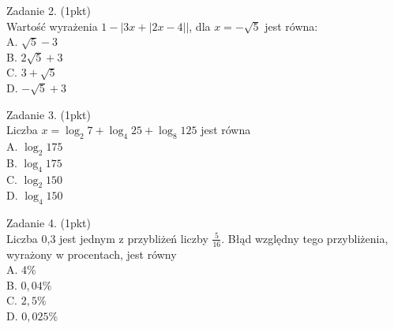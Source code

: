 \documentclass[10pt]{article}
\begin{document}
Zadanie 2. (1pkt)\\
Wartość wyrażenia \(1-|3 x+|2 x-4||\), dla \(x=-\sqrt{5}\) jest równa:\\
A. \(\sqrt{5}-3\)\\
B. \(2 \sqrt{5}+3\)\\
C. \(3+\sqrt{5}\)\\
D. \(-\sqrt{5}+3\)

Zadanie 3. (1pkt)\\
Liczba \(x=\log _{2} 7+\log _{4} 25+\log _{8} 125\) jest równa\\
A. \(\log _{2} 175\)\\
B. \(\log _{4} 175\)\\
C. \(\log _{2} 150\)\\
D. \(\log _{4} 150\)

Zadanie 4. (1pkt)\\
Liczba 0,3 jest jednym z przybliżeń liczby \(\frac{5}{16}\). Błąd względny tego przybliżenia, wyrażony w procentach, jest równy\\
A. \(4 \%\)\\
B. \(0,04 \%\)\\
C. \(2,5 \%\)\\
D. \(0,025 \%\)
\end{document}
